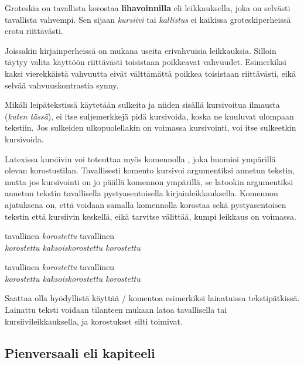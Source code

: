 \begin{tulossis}
  \sffamily Groteskia on tavallista korostaa \textbf{lihavoinnilla} eli
  leikkauksella, joka on selvästi tavallista vahvempi. Sen sijaan
  \textit{kursiivi} tai \textsl{kallistus} ei kaikissa groteskiperheissä
  erotu riittävästi.
\end{tulossis}

Joissakin kirjainperheissä on mukana useita erivahvuisia leikkauksia.
Silloin täytyy valita käyttöön riittävästi toisistaan poikkeavat
vahvuudet. Esimerkiksi kaksi vierekkäistä vahvuutta eivät välttämättä
poikkea toisistaan riittävästi, eikä selvää vahvuuskontrastia synny.

Mikäli leipätekstissä käytetään sulkeita ja niiden sisällä kursivoitua
ilmausta (\textit{kuten tässä}), ei itse suljemerkkejä pidä kursivoida,
koska ne kuuluvat ulompaan tekstiin. Jos sulkeiden ulkopuolellakin on
voimassa kursivointi, voi itse sulkeetkin kursivoida.

Latexissa kursiivin voi toteuttaa myös komennolla , joka
huomioi ympärillä olevan korostustilan. Tavallisesti komento kursivoi
argumentiksi annetun tekstin, mutta jos kursivointi on jo päällä
komennon ympärillä, se latookin argumentiksi annetun tekstin
tavallisella pystyasentoisella kirjainleikkauksella. Komennon ajatuksena
on, että voidaan samalla komennolla korostaa sekä pystyasentoisen
tekstin että kursiivin keskellä, eikä tarvitse välittää, kumpi leikkaus
on voimassa.

\begin{koodilohkosis}
  tavallinen \emph{korostettu} tavallinen \\
  \emph{korostettu \emph{kaksoiskorostettu} korostettu}
\end{koodilohkosis}

\begin{tulossis}
  tavallinen \emph{korostettu} tavallinen \\
  \emph{korostettu \emph{kaksoiskorostettu} korostettu}
\end{tulossis}

Saattaa olla hyödyllistä käyttää \-/ komentoa esimerkiksi
lainatuissa tekstipätkissä. Lainattu teksti voidaan tilanteen mukaan
latoa tavallisella tai kursiivileikkauksella, ja korostukset silti
toimivat.

\subsection{Pienversaali eli kapiteeli}
\label{luku:korostus_pienversaali}

